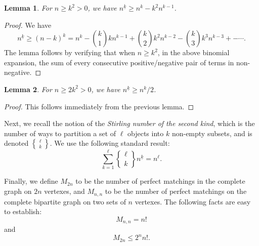 \documentclass[14pt]{extarticle}
\newtheorem{lemma}{Lemma}
\begin{document}
\begin{lemma}
\label{lemma-ffac1}
For $n \ge k^2 > 0$, we have $n^{\underline{k}}\ge n^k - k^2 n^{k-1}$.
\end{lemma}

\begin{proof}
We have 
\[
n^{\underline{k}} \ge (n-k)^k = n^k - {k \choose 1} k n^{k-1}
  + {k \choose 2} k^2 n^{k-2} - {k \choose 3} k^3 n^{k-3} + - \cdots . 
\]
The lemma follows by verifying that when  $n \ge k^2$,
in the above binomial expansion, the sum of every consecutive 
positive/negative pair of terms in non-negative.
\end{proof}

\begin{lemma}
\label{lemma-ffac2}
For $n \ge 2 k^2 > 0$, we have $n^{\underline{k}} \ge n^k/2$.
\end{lemma}

\begin{proof}
This follows immediately from the previous lemma.
\end{proof}

Next, we recall the notion of the {\em Stirling number of the second 
kind}, which is the number of ways to partition a set of $\ell$ objects
into $k$ non-empty subsets, and is denoted
${\ell \brace k}$.
We use the following standard result:
\begin{equation}
\label{eq-stirling}
\sum_{k=1}^\ell {\ell \brace k} n^{\underline{k}} = n^\ell .
\end{equation}

Finally, we define $M_{2 n}$ to be the number of perfect matchings
in the complete graph on $2n$ vertexes, and $M_{n,n}$
to be the number of perfect matchings on the complete
bipartite graph on two sets of $n$ vertexes.
The following facts are easy to establish:
\begin{equation}
\label{eq-match-bipartite}
M_{n,n} = n !
\end{equation}
and
\begin{equation}
\label{eq-match-all}
M_{2n} \le 2^n n! .
\end{equation}
\end{document}
